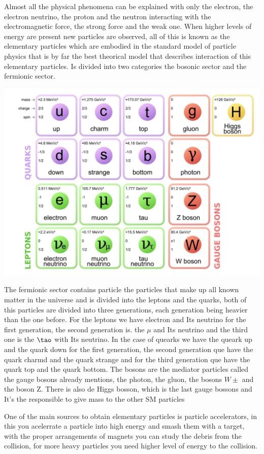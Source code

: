 Almost all the physical phenomena can be explained with only the electron, the electron neutrino, the proton and the neutron interacting with the electromagnetic force, the strong force and the weak one. When higher levels of energy are present new particles are observed, all of this is known as the elementary particles which are embodied in the standard model of particle physics that is by far the best theorical model that describes interaction of this elementary particles. Is divided into two categories the bosonic sector and the fermionic sector.  \cite{mppthomson}   

\includegraphics[scale=0.7]{sm.png}

The fermionic sector contains particle the particles that make up all known matter in the universe and is divided into the leptons and the quarks, both of this particles are divided into three generations, each generation being heavier than the one before. For the leptons we have electron and Its neutrino for the first generation, the second generation is. the $\mu$ and Its neutrino and the third one is the $\tao$ with Its neutrino. In the case of quearks we have the queark up and the quark down for the first generation, the second generation que have the quark charmd and the quark strange and for the third generation que have the quark top and the quark bottom. The bosons are the mediator particles called the gauge bosons already mentions, the photon, the gluon, the bosons $W\pm$ and the boson Z. There is also de Higgs bosson, which is the last gauge bossons and It's the responsible to give mass to the other SM particles  


One of the main sources to obtain elementary particles is particle accelerators, in this you acelerrate a particle into high energy and smash them with a target, with the proper  arrangements of magnets you can study the debris from the collision, for more heavy particles you need higher level of energy to the collision.

